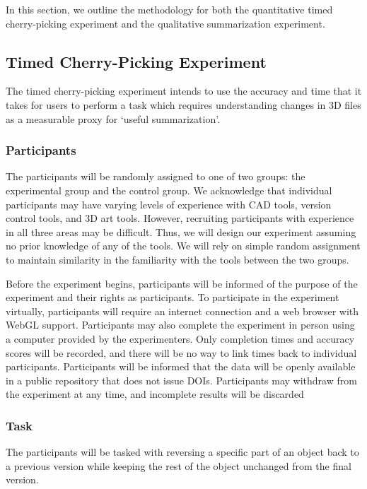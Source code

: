 \documentclass[sigconf,authorversion,nonacm]{acmart}
\begin{document}
In this section, we outline the methodology for both the quantitative timed cherry-picking experiment and the qualitative summarization experiment.

\subsection{Timed Cherry-Picking Experiment}

The timed cherry-picking experiment intends to use the accuracy and time that it takes for users to perform a task which requires understanding changes in 3D files as a measurable proxy for `useful summarization'.

\subsubsection{Participants}

The participants will be randomly assigned to one of two groups: the experimental group and the control group. 
We acknowledge that individual participants may have varying levels of experience with CAD tools, version control tools, and 3D art tools. 
However, recruiting participants with experience in all three areas may be difficult. Thus, we will design our experiment assuming no prior knowledge of any of the tools. 
We will rely on simple random assignment to maintain similarity in the familiarity with the tools between the two groups.

Before the experiment begins, participants will be informed of the purpose of the experiment and their rights as participants. 
To participate in the experiment virtually, participants will require an internet connection and a web browser with WebGL support. 
Participants may also complete the experiment in person using a computer provided by the experimenters. Only completion times and accuracy scores will be recorded, and there will be no way to link times back to individual participants. 
Participants will be informed that the data will be openly available in a public repository that does not issue DOIs. Participants may withdraw from the experiment at any time, and incomplete results will be discarded

\subsubsection{Task}

The participants will be tasked with reversing a specific part of an object back to a previous version while keeping the rest of the object unchanged from the final version.
\end{document}
